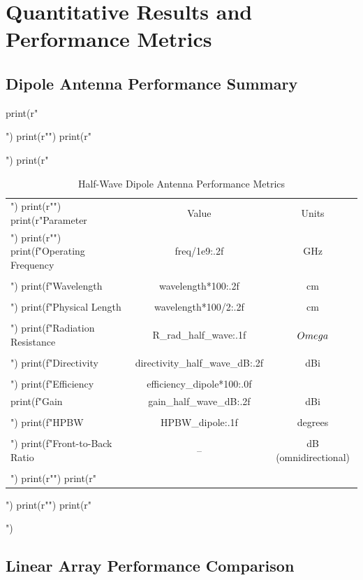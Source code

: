 \documentclass[a4paper, 11pt]{article}
\begin{document}
\section{Quantitative Results and Performance Metrics}

\subsection{Dipole Antenna Performance Summary}

\begin{pycode}
print(r"\begin{table}[htbp]")
print(r"\centering")
print(r"\caption{Half-Wave Dipole Antenna Performance Metrics}")
print(r"\begin{tabular}{lcc}")
print(r"\toprule")
print(r"Parameter & Value & Units \\")
print(r"\midrule")
print(f"Operating Frequency & {freq/1e9:.2f} & GHz \\\\")
print(f"Wavelength & {wavelength*100:.2f} & cm \\\\")
print(f"Physical Length & {wavelength*100/2:.2f} & cm \\\\")
print(f"Radiation Resistance & {R_rad_half_wave:.1f} & $\\Omega$ \\\\")
print(f"Directivity & {directivity_half_wave_dB:.2f} & dBi \\\\")
print(f"Efficiency & {efficiency_dipole*100:.0f} & \\%
print(f"Gain & {gain_half_wave_dB:.2f} & dBi \\\\")
print(f"HPBW & {HPBW_dipole:.1f} & degrees \\\\")
print(f"Front-to-Back Ratio & -- & dB (omnidirectional) \\\\")
print(r"\bottomrule")
print(r"\end{tabular}")
print(r"\label{tab:dipole_metrics}")
print(r"\end{table}")
\end{pycode}

\subsection{Linear Array Performance Comparison}
\end{document}
